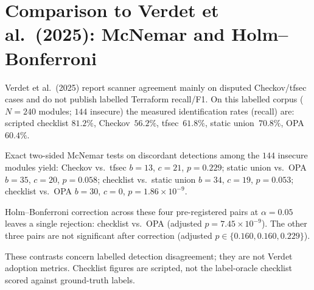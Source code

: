 
\section{Comparison to Verdet et al.\ (2025): McNemar and Holm--Bonferroni}
\label{sec:verdet-mcnemar}

Verdet et al.\ (2025) report scanner agreement mainly on disputed
Checkov/tfsec cases and do not publish labelled Terraform recall/F1.
On this labelled corpus ($N{=}240$ modules; $144$ insecure) the measured
identification rates (recall) are: scripted checklist $81.2\%$,
Checkov~$56.2\%$, tfsec~$61.8\%$, static union~$70.8\%$,
OPA~$60.4\%$.

Exact two-sided McNemar tests on discordant detections among the $144$
insecure modules yield:
Checkov vs.\ tfsec $b{=}13$, $c{=}21$, $p{=}0.229$;
static union vs.\ OPA $b{=}35$, $c{=}20$, $p{=}0.058$;
checklist vs.\ static union $b{=}34$, $c{=}19$, $p{=}0.053$;
checklist vs.\ OPA $b{=}30$, $c{=}0$, $p{=}1.86\times10^{-9}$.

Holm--Bonferroni correction across these four pre-registered pairs at
$\alpha{=}0.05$ leaves a single rejection: checklist vs.\ OPA
(adjusted $p{=}7.45\times10^{-9}$). The other three pairs are not
significant after correction (adjusted $p\in\{0.160,0.160,0.229\}$).

These contrasts concern labelled detection disagreement; they are not
Verdet adoption metrics. Checklist figures are scripted, not
the label-oracle checklist scored against ground-truth labels.
